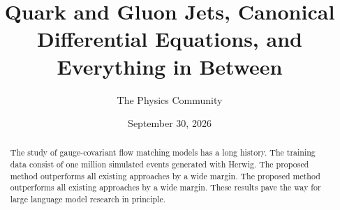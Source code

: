 \documentclass[11pt]{article}
\title{Quark and Gluon Jets, Canonical Differential Equations, and Everything in Between}
\author{The Physics Community}
\date{September 30, 2026}
\numberwithin{equation}{section}
\theoremstyle{definition}
\theoremstyle{remark}
\begin{document}
\maketitle
\begin{abstract}
The study of gauge-covariant flow matching models has a long history.
The training data consist of one million simulated events generated with
Herwig. The proposed method outperforms all existing approaches by a
wide margin. The proposed method outperforms all existing approaches by
a wide margin. These results pave the way for large language model
research in principle.
\end{abstract}
\tableofcontents




\nocite{*}


\end{document}
